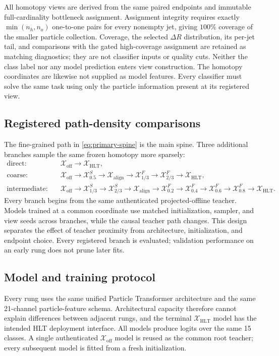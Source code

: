 \documentclass[11pt]{article}
\newcommand{\xoff}{\mathcal{X}_{\mathrm{off}}}
\newcommand{\xalign}{\mathcal{X}_{\mathrm{align}}}
\newcommand{\xhlt}{\mathcal{X}_{\mathrm{HLT}}}
\newcommand{\xsupp}[1]{\mathcal{X}^{S}_{#1}}
\newcommand{\xfield}[1]{\mathcal{X}^{F}_{#1}}
\begin{document}
All homotopy views are derived from the same paired endpoints and immutable
full-cardinality bottleneck assignment.  Assignment integrity requires
exactly $\min(n_h,n_o)$ one-to-one pairs for every nonempty jet, giving
$100\%$ coverage of the smaller particle collection.  Coverage, the selected
$\Delta R$ distribution, its per-jet tail, and comparisons with the gated
high-coverage assignment are retained as matching diagnostics; they are not
classifier inputs or quality cuts.  Neither the class label nor any model
prediction enters view construction.  The homotopy coordinates are likewise
not supplied as model features.  Every classifier must solve the same task
using only the particle information present at its registered view.

\subsection{Registered path-density comparisons}

The fine-grained path in \cref{eq:primary-spine} is the main spine.  Three
additional branches sample the same frozen homotopy more sparsely:
\begin{align}
    \text{direct:}\quad
      &\xoff \rightarrow \xhlt, \\
    \text{coarse:}\quad
      &\xoff \rightarrow \xsupp{0.5} \rightarrow \xalign
       \rightarrow \xfield{1/3} \rightarrow \xfield{2/3}
       \rightarrow \xhlt, \\
    \text{intermediate:}\quad
      &\xoff \rightarrow \xsupp{1/3} \rightarrow \xsupp{2/3}
       \rightarrow \xalign \rightarrow \xfield{0.2}
       \rightarrow \xfield{0.4} \rightarrow \xfield{0.6}
       \rightarrow \xfield{0.8} \rightarrow \xhlt.
    \label{eq:path-density-branches}
\end{align}
Every branch begins from the same authenticated projected-offline teacher.
Models trained at a common coordinate use matched initialization, sampler,
and view seeds across branches, while the causal teacher path changes.  This
design separates the effect of teacher proximity from architecture,
initialization, and endpoint choice.  Every registered branch is evaluated;
validation performance on an early rung does not prune later fits.

\subsection{Model and training protocol}

Every rung uses the same unified Particle Transformer architecture and the
same 21-channel particle-feature schema.  Architectural capacity therefore
cannot explain differences between adjacent rungs, and the terminal $\xhlt$
model has the intended HLT deployment interface.  All models produce logits
over the same 15 classes.  A single authenticated $\xoff$ model is reused as
the common root teacher; every subsequent model is fitted from a fresh
initialization.
\end{document}
